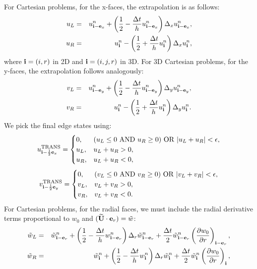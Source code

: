 \documentclass[11pt]{article}
\def\half  {\frac{1}{2}}
\def\dt    {\Delta t}
\def\trans {\rm TRANS}
\def\eb    {{\bf e}}
\def\ib    {{\bf i}}
\def\Ubt   {\widetilde{\bf U}}
\def\wt    {\tilde{w}}
\begin{document}
For Cartesian problems, for the x-faces, the extrapolation is as follows:
\begin{eqnarray}
u_L &=& u_{\ib-\eb_x}^n + \left(\half - \frac{\dt}{h}u_{\ib-\eb_x}^n\right)\Delta_x u_{\ib-\eb_x}^n, \\
u_R &=& u_{\ib}^n - \left(\half + \frac{\dt}{h}u_{\ib}^n\right)\Delta_x u_{\ib}^n,
\end{eqnarray}
where $\ib = (i,r)$ in 2D and $\ib = (i,j,r)$ in 3D.  For 3D Cartesian problems, for the y-faces, the extrapolation follows analogously:
\begin{eqnarray}
v_L &=& u_{\ib-\eb_y}^n + \left(\half - \frac{\dt}{h}u_{\ib-\eb_y}^n\right)\Delta_y u_{\ib-\eb_y}^n, \\
v_R &=& u_{\ib}^n - \left(\half + \frac{\dt}{h}u_{\ib}^n\right)\Delta_y u_{\ib}^n.
\end{eqnarray}
We pick the final edge states using:
\begin{equation}
u^{\trans}_{\ib-\half\eb_x} =
\begin{cases}
0, & (u_L \le 0 ~ {\rm AND} ~ u_R \ge 0) ~ {\rm OR} ~ |u_L + u_R| < \epsilon, \\
u_L, & u_L + u_R > 0, \\
u_R, & u_L + u_R < 0, \\
\end{cases}
\end{equation}
\begin{equation}
v^{\trans}_{\ib-\half\eb_y} =
\begin{cases}
0, & (v_L \le 0 ~ {\rm AND} ~ v_R \ge 0) ~ {\rm OR} ~ |v_L + v_R| < \epsilon, \\
v_L, & v_L + v_R > 0, \\
v_R, & v_L + v_R < 0. \\
\end{cases}
\end{equation}
For Cartesian problems, for the radial faces, we must include the radial derivative terms proportional to $w_0$ and $(\Ubt\cdot\eb_r) = \wt$:
\begin{eqnarray}
\wt_L &=& \wt_{\ib-\eb_r}^n + \left(\half - \frac{\dt}{h}w_{\ib-\eb_r}^n\right)\Delta_r \wt_{\ib-\eb_r}^n + \frac{\dt}{2}\wt_{\ib-\eb_r}^n\left(\frac{\partial w_0}{\partial r}\right)_{\ib-\eb_r},\label{Radial utrans_L} \\
\wt_R &=& \wt_{\ib}^n + \left(\half - \frac{\dt}{h}w_{\ib}^n\right)\Delta_r \wt_{\ib}^n + \frac{\dt}{2}\wt_{\ib}^n\left(\frac{\partial w_0}{\partial r}\right)_{\ib},\label{Radial utrans_R}
\end{eqnarray}
\end{document}
